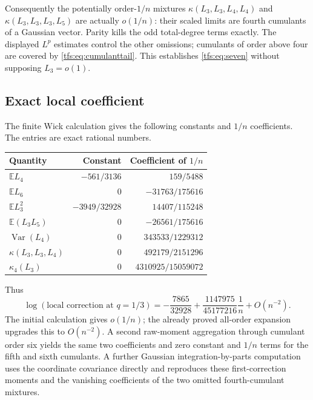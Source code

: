\documentclass[11pt,a4paper]{article}
\numberwithin{equation}{section}
\theoremstyle{remark}
\newcommand{\E}{\mathbb E}
\newcommand{\1}{\mathbf 1}
\newcommand{\Var}{\operatorname{Var}}
\begin{document}
Consequently the potentially order-$1/n$ mixtures
$\kappa(L_3,L_3,L_4,L_4)$ and
$\kappa(L_3,L_3,L_3,L_5)$ are actually $o(1/n)$: their scaled limits are
fourth cumulants of a Gaussian vector. Parity kills the odd total-degree
terms exactly. The displayed $L^p$ estimates control the other omissions;
cumulants of order above four are covered by \eqref{tfs:eq:cumulanttail}.
This establishes \eqref{tfs:eq:seven} without supposing $L_3=o(1)$.

\subsection{Exact local coefficient}
The finite Wick calculation gives the following constants and $1/n$
coefficients. The entries are exact rational numbers.
\begin{center}
\begin{tabular}{@{}lrr@{}}
\toprule
Quantity & Constant & Coefficient of $1/n$\\
\midrule
$\E L_4$ & $-561/3136$ & $159/5488$\\
$\E L_6$ & $0$ & $-31763/175616$\\
$\E L_3^2$ & $-3949/32928$ & $14407/115248$\\
$\E(L_3L_5)$ & $0$ & $-26561/175616$\\
$\Var(L_4)$ & $0$ & $343533/1229312$\\
$\kappa(L_3,L_3,L_4)$ & $0$ & $492179/2151296$\\
$\kappa_4(L_3)$ & $0$ & $4310925/15059072$\\
\bottomrule
\end{tabular}
\end{center}
Thus
\begin{equation}\label{tfs:eq:localfirst}
\log(\text{local correction at }q=1/3)
=-\frac{7865}{32928}+\frac{1147975}{45177216}\frac1n+O(n^{-2}).
\end{equation}
The initial calculation gives $o(1/n)$; the already proved all-order
expansion upgrades this to $O(n^{-2})$. A second raw-moment aggregation
through cumulant order six yields the same two coefficients and zero
constant and $1/n$ terms for the fifth and sixth cumulants.
A further Gaussian integration-by-parts computation uses the coordinate
covariance directly and reproduces these first-correction moments and the
vanishing coefficients of the two omitted fourth-cumulant mixtures.
\end{document}
